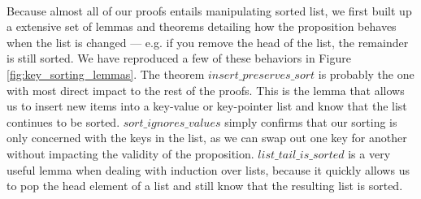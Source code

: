 \paragraph{}
Because almost all of our proofs entails manipulating sorted list, we first built up a extensive set of lemmas and theorems detailing how the proposition behaves when the list is changed --- e.g. if you remove the head of the list, the remainder is still sorted. We have reproduced a few of these behaviors in Figure \ref{fig:key_sorting_lemmas}. The theorem $insert\_preserves\_sort$ is probably the one with most direct impact to the rest of the proofs. This is the lemma that allows us to insert new items into a key-value or key-pointer list and know that the list continues to be sorted. $sort\_ignores\_values$ simply confirms that our sorting is only concerned with the keys in the list, as we can swap out one key for another without impacting the validity of the proposition. $list\_tail\_is\_sorted$ is a very useful lemma when dealing with induction over lists, because it quickly allows us to pop the head element of a list and still know that the resulting list is sorted.

